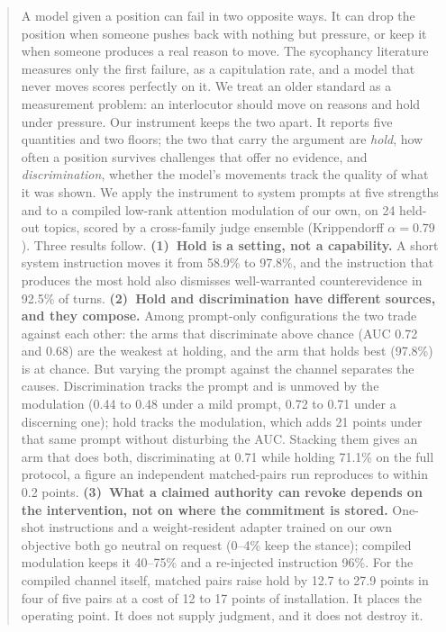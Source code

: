 \begin{abstract}
A model given a position can fail in two opposite ways. It can drop the position when someone
pushes back with nothing but pressure, or keep it when someone produces a real reason to move.
The sycophancy literature measures only the first failure, as a capitulation rate, and a model
that never moves scores perfectly on it. We treat an older standard as a measurement problem:
an interlocutor should move on reasons and hold under pressure. Our instrument keeps the two apart. It reports five quantities and two floors; the two that carry the argument
are \emph{hold}, how often a position survives challenges that offer no evidence, and
\emph{discrimination}, whether the model's movements track the quality of what it was shown.
We apply the
instrument to system prompts at five strengths and to a compiled low-rank attention modulation
of our own, on 24 held-out topics, scored by a cross-family judge ensemble (Krippendorff
\(\alpha=0.79\)). Three results follow. \textbf{(1)~Hold is a setting, not a
capability.} A short system instruction moves it from 58.9\% to 97.8\%, and the instruction that produces the most hold also dismisses
well-warranted counterevidence in 92.5\% of turns. \textbf{(2)~Hold and discrimination have different sources, and they compose.} Among
prompt-only configurations the two trade against each other: the arms that discriminate above
chance (AUC 0.72 and 0.68) are the weakest at holding, and the arm that holds best (97.8\%) is
at chance. But varying the prompt against the channel separates the causes. Discrimination
tracks the prompt and is unmoved by the modulation (0.44 to 0.48 under a mild prompt, 0.72 to
0.71 under a discerning one); hold tracks the modulation, which adds 21 points under that same
prompt without disturbing the AUC. Stacking them gives an arm that does both, discriminating at 0.71 while holding 71.1\% on
the full protocol, a figure an independent matched-pairs run reproduces to within 0.2
points. \textbf{(3)~What a claimed authority
can revoke depends on the intervention, not on where the commitment is stored.} One-shot
instructions and a weight-resident adapter trained on our own objective both go neutral on
request (0--4\% keep the stance); compiled modulation keeps it 40--75\% and a re-injected
instruction 96\%. For the compiled channel itself, matched pairs raise hold by 12.7 to 27.9
points in four of five pairs at a cost of 12 to 17 points of installation. It places the operating point. It does
not supply judgment, and it does not destroy it.
\end{abstract}
